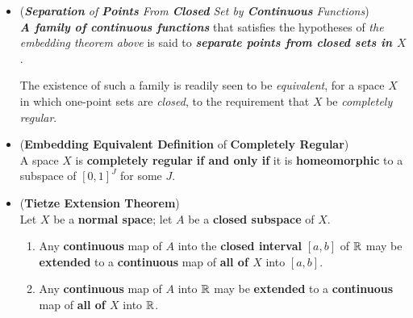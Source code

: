 \documentclass[11pt]{article}
\begin{document}
\begin{itemize}
\item \begin{definition} (\emph{\textbf{Separation} of \textbf{Points} From \textbf{Closed} Set by \textbf{Continuous} Functions})\\
\emph{\textbf{A family of continuous functions}} that satisfies the hypotheses of \emph{the embedding theorem above} is said to \emph{\textbf{separate points from closed sets in $X$}}. 

The existence of such a family is readily seen to be \emph{equivalent}, for a space $X$ in which one-point sets are \emph{closed}, to the requirement that $X$ be \emph{completely regular}.
\end{definition}

\item \begin{corollary} (\textbf{Embedding Equivalent Definition} of \textbf{Completely Regular}) \citep{munkres2000topology}\\
A space $X$ is \textbf{completely regular} \textbf{if and only if} it is \textbf{homeomorphic} to a subspace of $[0, 1]^J$ for some $J$.
\end{corollary}

\item \begin{theorem} (\textbf{Tietze Extension Theorem}) \citep{munkres2000topology, reed1980methods}\\
Let $X$ be a \textbf{normal space}; let $A$ be a \textbf{closed subspace} of $X$.
\begin{enumerate}
\item Any \textbf{continuous} map of $A$ into the \textbf{closed interval} $[a, b]$ of ${\mathbb R}$ may be \textbf{extended}
to a \textbf{continuous} map of \textbf{all of $X$} into $[a, b]$.
\item Any \textbf{continuous} map of $A$ into ${\mathbb R}$ may be \textbf{extended} to a \textbf{continuous} map of \textbf{all of $X$} into ${\mathbb R}$.
\end{enumerate}
\end{theorem}



\end{itemize}
\end{document}
